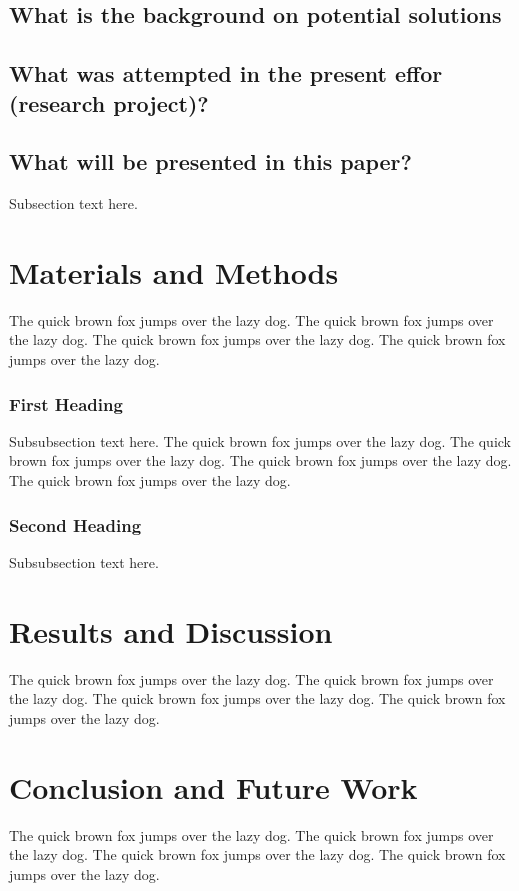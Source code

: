 \documentclass[journal]{./IEEE/IEEEtran}
\begin{document}
\subsection{What is the background on potential solutions}

\subsection{What was attempted in the present effor (research project)?}

\subsection{What will be presented in this paper?}
Subsection text here.

\section{Materials and Methods}
The quick brown fox jumps over the lazy dog. The quick brown fox jumps over
the lazy dog. The quick brown fox jumps over the lazy dog. The quick brown
fox jumps over the lazy dog.

\subsubsection{First Heading}
Subsubsection text here. The quick brown fox jumps over the lazy dog. The quick
brown fox jumps over the lazy dog. The quick brown fox jumps over the lazy dog. The
quick brown fox jumps over the lazy dog.

\subsubsection{Second Heading}
Subsubsection text here.

\section{Results and Discussion}
The quick brown fox jumps over the lazy dog. The quick brown fox jumps over
the lazy dog. The quick brown fox jumps over the lazy dog. The quick brown
fox jumps over the lazy dog.

\section{Conclusion and Future Work}
The quick brown fox jumps over the lazy dog. The quick brown fox jumps over
the lazy dog. The quick brown fox jumps over the lazy dog. The quick brown
fox jumps over the lazy dog.
\end{document}
